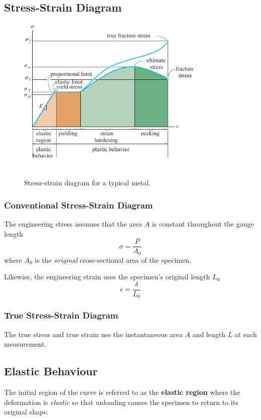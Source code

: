 \documentclass{article}
\begin{document}
\subsection{Stress-Strain Diagram}
\begin{figure}[H]
    \centering
    \includegraphics[height = 8cm, keepaspectratio = true]{figures/stress_strain_diagram.pdf}
    \caption{Stress-strain diagram for a typical metal.}
\end{figure}
\subsubsection{Conventional Stress-Strain Diagram}
The engineering stress assumes that the area \(A\) is constant throughout
the gauge length
\begin{equation*}
    \sigma = \frac{P}{A_0}
\end{equation*}
where \(A_0\) is the \textit{original} cross-sectional area of the specimen.

Likewise, the engineering strain uses the specimen's original length \(L_0\)
\begin{equation*}
    \epsilon = \frac{\delta}{L_0}
\end{equation*}
\subsubsection{True Stress-Strain Diagram}
The true stress and true strain use the instantaneous area \(A\) and length \(L\)
at each measurement.
\subsection{Elastic Behaviour}
The initial region of the curve is referred to as the \textbf{elastic region}
where the deformation is \textit{elastic} so that unloading causes
the specimen to return to its original shape.
\end{document}
